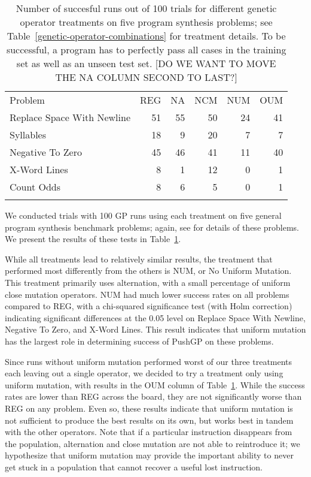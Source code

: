 \begin{table}[t]
\centering
\label{genetic-operator-results}
\caption{Number of succesful runs out of 100 trials for different genetic operator treatments on five program synthesis problems; see Table~\ref{genetic-operator-combinations} for treatment details. To be successful, a program has to perfectly pass all cases in the training set as well as an unseen test set. [DO WE WANT TO MOVE THE NA COLUMN SECOND TO LAST?]}
\begin{tabular}{l r r r r r}
\hline\noalign{\smallskip}
Problem                    & REG & NA & NCM & NUM & OUM \\
\noalign{\smallskip}\svhline\noalign{\smallskip}
Replace Space With Newline &  51 & 55 &  50 &  24 &  41 \\
Syllables                  &  18 &  9 &  20 &   7 &   7 \\
Negative To Zero           &  45 & 46 &  41 &  11 &  40 \\
X-Word Lines               &   8 &  1 &  12 &   0 &   1 \\
Count Odds                 &   8 &  6 &   5 &   0 &   1 \\
\noalign{\smallskip}\hline\noalign{\smallskip}
\end{tabular}
\end{table}

We conducted trials with 100 GP runs using each treatment on five general program synthesis benchmark problems; again, see \cite{Helmuth:2015:GECCO} for details of these problems. We present the results of these tests in Table~\ref{genetic-operator-results}.

While all treatments lead to relatively similar results, the treatment that performed most differently from the others is NUM, or No Uniform Mutation. This treatment primarily uses alternation, with a small percentage of uniform close mutation operators. NUM had much lower success rates on all problems compared to REG, with a chi-squared significance test (with Holm correction) indicating significant differences at the 0.05 level on Replace Space With Newline, Negative To Zero, and X-Word Lines. This result indicates that uniform mutation has the largest role in determining success of PushGP on these problems.

Since runs without uniform mutation performed worst of our three treatments each leaving out a single operator, we decided to try a treatment only using uniform mutation, with results in the OUM column of Table~\ref{genetic-operator-results}. While the success rates are lower than REG across the board, they are not significantly worse than REG on any problem. Even so, these results indicate that uniform mutation is not sufficient to produce the best results on its own, but works best in tandem with the other operators. Note that if a particular instruction disappears from the population, alternation and close mutation are not able to reintroduce it; we hypothesize that uniform mutation may provide the important ability to never get stuck in a population that cannot recover a useful lost instruction.

